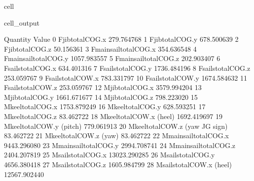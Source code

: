 \documentclass[letterpaper,10pt,english]{jupyterBook}
\begin{document}
\begin{sphinxuseclass}{cell}
\begin{sphinxVerbatimOutput}
\begin{sphinxuseclass}{cell_output}
\begin{sphinxVerbatim}[commandchars=\\\{\}]
                               Quantity         Value
0                     F\PYGZus{}jib\PYGZus{}total\PYGZus{}COG.x   \PYGZhy{}279.764768
1                     F\PYGZus{}jib\PYGZus{}total\PYGZus{}COG.y    678.500639
2                     F\PYGZus{}jib\PYGZus{}total\PYGZus{}COG.z    \PYGZhy{}50.156361
3               F\PYGZus{}main\PYGZus{}sail\PYGZus{}total\PYGZus{}COG.x   \PYGZhy{}354.636548
4               F\PYGZus{}main\PYGZus{}sail\PYGZus{}total\PYGZus{}COG.y   1057.983557
5               F\PYGZus{}main\PYGZus{}sail\PYGZus{}total\PYGZus{}COG.z   \PYGZhy{}202.903407
6                   F\PYGZus{}sails\PYGZus{}total\PYGZus{}COG.x   \PYGZhy{}634.401316
7                   F\PYGZus{}sails\PYGZus{}total\PYGZus{}COG.y   1736.484196
8                   F\PYGZus{}sails\PYGZus{}total\PYGZus{}COG.z   \PYGZhy{}253.059767
9                   F\PYGZus{}sails\PYGZus{}total\PYGZus{}COW.x   \PYGZhy{}783.331797
10                  F\PYGZus{}sails\PYGZus{}total\PYGZus{}COW.y   1674.584632
11                  F\PYGZus{}sails\PYGZus{}total\PYGZus{}COW.z   \PYGZhy{}253.059767
12                    M\PYGZus{}jib\PYGZus{}total\PYGZus{}COG.x  \PYGZhy{}3579.994204
13                    M\PYGZus{}jib\PYGZus{}total\PYGZus{}COG.y  \PYGZhy{}1661.671677
14                    M\PYGZus{}jib\PYGZus{}total\PYGZus{}COG.z   \PYGZhy{}798.223020
15                   M\PYGZus{}keel\PYGZus{}total\PYGZus{}COG.x  \PYGZhy{}1753.879249
16                   M\PYGZus{}keel\PYGZus{}total\PYGZus{}COG.y   \PYGZhy{}628.593251
17                   M\PYGZus{}keel\PYGZus{}total\PYGZus{}COG.z     83.462722
18            M\PYGZus{}keel\PYGZus{}total\PYGZus{}COW.x (heel)  \PYGZhy{}1692.419697
19           M\PYGZus{}keel\PYGZus{}total\PYGZus{}COW.y (pitch)   \PYGZhy{}779.061913
20   M\PYGZus{}keel\PYGZus{}total\PYGZus{}COW.z (yaw \PYGZhy{} JG sign)    \PYGZhy{}83.462722
21             M\PYGZus{}keel\PYGZus{}total\PYGZus{}COW.z (yaw)     83.462722
22              M\PYGZus{}main\PYGZus{}sail\PYGZus{}total\PYGZus{}COG.x  \PYGZhy{}9443.296080
23              M\PYGZus{}main\PYGZus{}sail\PYGZus{}total\PYGZus{}COG.y  \PYGZhy{}2994.708741
24              M\PYGZus{}main\PYGZus{}sail\PYGZus{}total\PYGZus{}COG.z   2404.207819
25                  M\PYGZus{}sails\PYGZus{}total\PYGZus{}COG.x \PYGZhy{}13023.290285
26                  M\PYGZus{}sails\PYGZus{}total\PYGZus{}COG.y  \PYGZhy{}4656.380418
27                  M\PYGZus{}sails\PYGZus{}total\PYGZus{}COG.z   1605.984799
28           M\PYGZus{}sails\PYGZus{}total\PYGZus{}COW.x (heel) \PYGZhy{}12567.902440

\end{sphinxVerbatim}
\end{sphinxuseclass}
\end{sphinxVerbatimOutput}
\end{sphinxuseclass}
\end{document}
